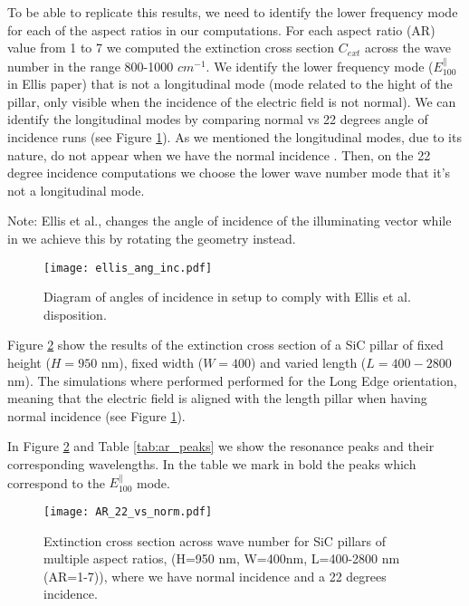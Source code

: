 To be able to replicate this results, we need to identify the lower frequency mode for each of
the aspect ratios in our computations. For each aspect ratio (AR) 
value from 1 to 7 we computed the extinction cross section $C_{ext}$ across the wave number in the range
800-1000 $cm^{-1}$. We identify the lower frequency mode ($E^{\parallel}_{100}$ in Ellis paper)  that is not a 
longitudinal mode (mode related to the hight of the pillar, only visible when the incidence of the 
electric field is not normal). We can identify the longitudinal modes by comparing normal vs 22 degrees 
angle of incidence runs (see Figure \ref{fig:ellis_ang_inc}). As we mentioned the longitudinal modes, due to its nature, do not appear when we 
have the normal incidence . Then, on the 22 degree incidence computations we choose the lower wave number mode
that it's not a longitudinal mode. 

Note: Ellis et al., changes the angle of incidence of the illuminating vector while in \pygbe we achieve this by
rotating the geometry instead. 

\begin{figure}
    \centering
    \texttt{[image: ellis\_ang\_inc.pdf]} 
    \caption{Diagram of angles of incidence in \pygbe setup to comply with Ellis et al. disposition.}
    \label{fig:ellis_ang_inc}
 \end{figure}

Figure \ref{fig:AR_22_vs_norm} show the results of the extinction cross section of a SiC pillar of fixed
height ($H=950$ nm), fixed width ($W=400$) and varied length ($L=400-2800$ nm). The simulations where performed 
performed for the Long Edge orientation, meaning that the electric field is aligned with the length pillar 
when having normal incidence (see Figure \ref{fig:ellis_ang_inc}). 

In Figure \ref{fig:AR_22_vs_norm} and Table \ref{tab:ar_peaks} we show the resonance peaks and
their corresponding wavelengths. In the table we mark in bold the peaks which correspond to 
the $E^{\parallel}_{100}$ mode. 

\begin{figure}
    \centering
    \texttt{[image: AR\_22\_vs\_norm.pdf]} 
    \caption{Extinction cross section across wave number for SiC pillars of multiple aspect ratios,  
             (H=950 nm, W=400nm, L=400-2800 nm (AR=1-7)), where we have normal incidence and a 
             22 degrees incidence.
            }
    \label{fig:AR_22_vs_norm}
 \end{figure}


